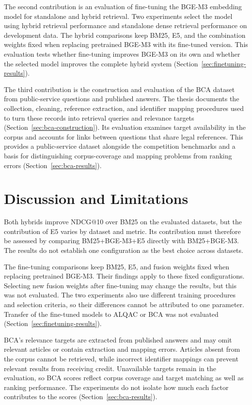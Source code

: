 The second contribution is an evaluation of fine-tuning the BGE-M3 embedding model for standalone and hybrid retrieval. Two experiments select the model using hybrid retrieval performance and standalone dense retrieval performance on development data. The hybrid comparisons keep BM25, E5, and the combination weights fixed when replacing pretrained BGE-M3 with its fine-tuned version. This evaluation tests whether fine-tuning improves BGE-M3 on its own and whether the selected model improves the complete hybrid system (Section~\ref{sec:finetuning-results}).

The third contribution is the construction and evaluation of the BCA dataset from public-service questions and published answers. The thesis documents the collection, cleaning, reference extraction, and identifier mapping procedures used to turn these records into retrieval queries and relevance targets (Section~\ref{sec:bca-construction}). Its evaluation examines target availability in the corpus and accounts for links between questions that share legal references. This provides a public-service dataset alongside the competition benchmarks and a basis for distinguishing corpus-coverage and mapping problems from ranking errors (Section~\ref{sec:bca-results}).

\section{Discussion and Limitations}

Both hybrids improve NDCG@10 over BM25 on the evaluated datasets, but the contribution of E5 varies by dataset and metric. Its contribution must therefore be assessed by comparing BM25+BGE-M3+E5 directly with BM25+BGE-M3. The results do not establish one configuration as the best choice across datasets.

The fine-tuning comparisons keep BM25, E5, and fusion weights fixed when replacing pretrained BGE-M3. Their findings apply to these fixed configurations. Selecting new fusion weights after fine-tuning may change the results, but this was not evaluated. The two experiments also use different training procedures and selection criteria, so their differences cannot be attributed to one parameter. Transfer of the fine-tuned models to ALQAC or BCA was not evaluated (Section~\ref{sec:finetuning-results}).

BCA's relevance targets are extracted from published answers and may omit relevant articles or contain extraction and mapping errors. Articles absent from the corpus cannot be retrieved, while incorrect identifier mappings can prevent relevant results from receiving credit. Unavailable targets remain in the evaluation, so BCA scores reflect corpus coverage and target matching as well as ranking performance. The experiments do not isolate how much each factor contributes to the scores (Section~\ref{sec:bca-results}).

